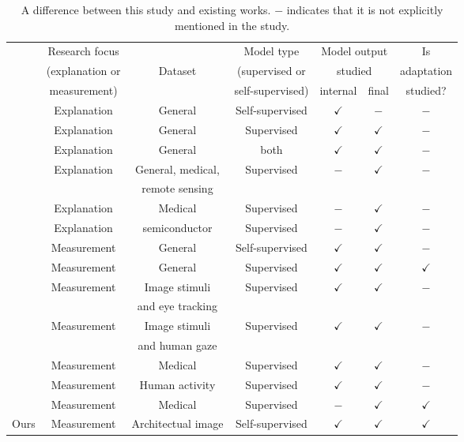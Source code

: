 \documentclass[lineno,pdflatex,sn-mathphys-num]{sn-jnl}%
\theoremstyle{thmstyleone}%
\theoremstyle{thmstyletwo}%
\theoremstyle{thmstylethree}%
\begin{document}
\begin{table}[!h]
\caption{A difference between this study and existing works. $-$ indicates that it is not explicitly mentioned in the study.\label{table review}}
\begin{tabular}{ccccccc}
\hline
 & Research focus  &  & Model type & \multicolumn{2}{c}{Model output}  & Is \\
 & (explanation or & Dataset & (supervised or & \multicolumn{2}{c}{ studied}  & adaptation \\
 &  measurement) &  & self-supervised) & internal & final &  studied? \\ \hline\hline
\cite{Kang20259339} & Explanation & General & Self-supervised & $\checkmark$ & $-$ & $-$ \\
\cite{Jo2025582} & Explanation & General & Supervised & $\checkmark$ & $\checkmark$ & $-$ \\
\cite{Liao2025PR} & Explanation & General & both & $\checkmark$ & $\checkmark$ & $-$ \\
\cite{Hanna25ICCV} & Explanation & General, medical, & Supervised & $-$ & $\checkmark$ & $-$ \\
 &  & remote sensing &   &  &  & \\
\cite{Cascone25ICCV} & Explanation & Medical & Supervised & $-$ & $\checkmark$ & $-$ \\
\cite{Feng2025AI} & Explanation & semiconductor & Supervised & $-$ & $\checkmark$ & $-$ \\
\hline
\cite{park2023what} & Measurement & General & Self-supervised & $\checkmark$ & $\checkmark$ & $-$ \\
\cite{Walmer23CVPR} & Measurement & General & Supervised & $\checkmark$ & $\checkmark$ & $\checkmark$ \\
\cite{Carrasco2026} & Measurement & Image stimuli & Supervised & $\checkmark$ & $\checkmark$ & $-$ \\
 &  & and eye tracking &   &  &  & \\
\cite{Yamamoto2025} & Measurement & Image stimuli & Supervised & $\checkmark$ & $\checkmark$ & $-$ \\
 &  & and human gaze &   &  &  & \\
\cite{Cascone2026947} & Measurement & Medical & Supervised & $\checkmark$ & $\checkmark$ & $-$ \\
\cite{Tempel2025} & Measurement & Human activity & Supervised & $\checkmark$ & $\checkmark$ & $-$ \\
\cite{Chung2025110} & Measurement & Medical & Supervised & $-$ & $\checkmark$ & $\checkmark$ \\ \hline
Ours & Measurement & Architectual image & Self-supervised & $\checkmark$ & $\checkmark$ & $\checkmark$ \\ \hline
\end{tabular}
\end{table}
\end{document}

